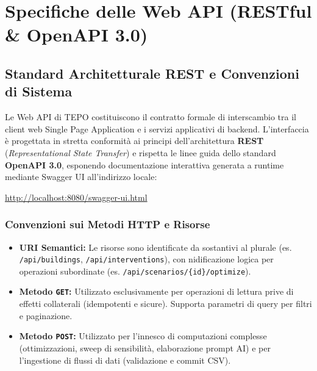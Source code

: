\section{Specifiche delle Web API (RESTful \& OpenAPI 3.0)}
\label{sec:specifiche_web_api}

\subsection{Standard Architetturale REST e Convenzioni di Sistema}
Le Web API di TEPO costituiscono il contratto formale di interscambio tra il client web Single Page Application e i servizi applicativi di backend. L'interfaccia è progettata in stretta conformità ai principi dell'architettura \textbf{REST} (\emph{Representational State Transfer}) e rispetta le linee guida dello standard \textbf{OpenAPI 3.0}, esponendo documentazione interattiva generata a runtime mediante Swagger UI all'indirizzo locale:
\begin{center}
    \url{http://localhost:8080/swagger-ui.html}
\end{center}

\subsubsection{Convenzioni sui Metodi HTTP e Risorse}
\begin{itemize}[leftmargin=1.5em, itemsep=0.2em]
    \item \textbf{URI Semantici:} Le risorse sono identificate da sostantivi al plurale (es. \texttt{/api/buildings}, \texttt{/api/interventions}), con nidificazione logica per operazioni subordinate (es. \texttt{/api/scenarios/\{id\}/optimize}).
    \item \textbf{Metodo \texttt{GET}:} Utilizzato esclusivamente per operazioni di lettura prive di effetti collaterali (idempotenti e sicure). Supporta parametri di query per filtri e paginazione.
    \item \textbf{Metodo \texttt{POST}:} Utilizzato per l'innesco di computazioni complesse (ottimizzazioni, sweep di sensibilità, elaborazione prompt AI) e per l'ingestione di flussi di dati (validazione e commit CSV).
\end{itemize}

